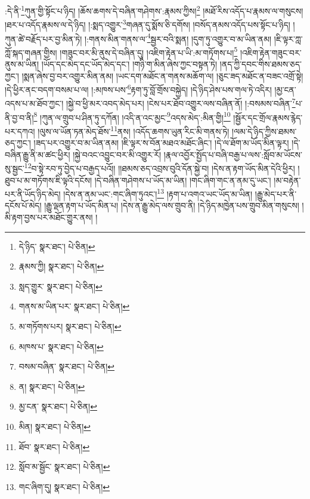 :དེ་ནི་\footnote{དེ་ཉིད་  སྣར་ཐང་།  པེ་ཅིན། }ཀུན་གྱི་སྟོང་པ་ཉིད། །ཆོས་ཆགས་དེ་བཞིན་གཤེགས་:རྣམས་ཀྱིས།\footnote{རྣམས་ཀྱི།  སྣར་ཐང་།  པེ་ཅིན། } །མཐོ་རིས་འདོད་པ་རྣམས་ལ་གསུངས། །ཐར་པ་འདོད་རྣམས་ལ་དེ་ཉིད། །:སྨད་འགྱུར་\footnote{སླད་གྱུར་  སྣར་ཐང་།  པེ་ཅིན། }གཞན་དུ་སྨོས་ཅི་དགོས། །བསོད་ནམས་འདོད་པས་སྟོང་པ་ཉིད། །ཀུན་ཚེ་བརྗོད་པར་བྱ་མིན་ཏེ། །:གནས་མིན་གནས་ལ་\footnote{གནས་མ་ཡིན་པར་  སྣར་ཐང་།  པེ་ཅིན། }སྦྱར་བའི་སྨན། །དུག་ཏུ་འགྱུར་བ་མ་ཡིན་ནམ། །ཇི་ལྟར་ཀླ་ཀློ་སྐད་གཞན་གྱིས། །གཟུང་བར་མི་ནུས་དེ་བཞིན་དུ། །འཇིག་རྟེན་པ་ཡི་:མ་གཏོགས་པ།\footnote{མ་གཏོགས་པར།  སྣར་ཐང་།  པེ་ཅིན། } །འཇིག་རྟེན་གཟུང་བར་ནུས་མ་ཡིན། །ཡོད་དང་མེད་དང་ཡོད་མེད་དང་། །གཉི་ག་མིན་ཞེས་ཀྱང་བསྟན་ཏེ། །ནད་ཀྱི་དབང་གིས་ཐམས་ཅད་ཀྱང་། །སྨན་ཞེས་བྱ་བར་འགྱུར་མིན་ནམ། །ཡང་དག་མཐོང་ན་གནས་མཆོག་ལ། །ཅུང་ཟད་མཐོང་ན་བཟང་འགྲོ་སྟེ། །དེ་ཕྱིར་ནང་བདག་བསམ་པ་ལ། །:མཁས་པས་\footnote{མཁས་པ་  སྣར་ཐང་།  པེ་ཅིན། }རྟག་ཏུ་བློ་གྲོས་བསྐྱེད། །དེ་ཉིད་ཤེས་པས་གལ་ཏེ་འདིར། །མྱ་ངན་འདས་པ་མ་ཐོབ་ཀྱང་། །སྐྱེ་བ་ཕྱི་མར་འབད་མེད་པར། །ངེས་པར་ཐོབ་འགྱུར་ལས་བཞིན་ནོ། །:བསམས་བཞིན་\footnote{བསམ་བཞིན་  སྣར་ཐང་།  པེ་ཅིན། }པ་ནི་བྱ་བ་ནི།\footnote{ན།  སྣར་ཐང་།  པེ་ཅིན། } །ཀུན་ལ་གྲུབ་པ་ཤིན་ཏུ་དཀོན། །འདི་ན་འང་མྱང་\footnote{མྱ་ངན་  སྣར་ཐང་།  པེ་ཅིན། }འདས་མེད་:མིན་གྱི།\footnote{མིན།  སྣར་ཐང་།  པེ་ཅིན། } །སྦྱོར་དང་གྲོལ་རྣམས་རྙེད་པར་དཀའ། །ལུས་ལ་ཡོན་ཏན་མེད་ཐོས་\footnote{ཐོབ་  སྣར་ཐང་།  པེ་ཅིན། }ནས། །འདོད་ཆགས་ཡུན་རིང་མི་གནས་ཏེ། །ལམ་དེ་ཉིད་ཀྱིས་ཐམས་ཅད་ཀྱང་། །ཟད་པར་འགྱུར་བ་མ་ཡིན་ནམ། །ཇི་ལྟར་ས་བོན་མཐའ་མཐོང་ཞིང་། །དེ་ལ་ཐོག་མ་ཡོད་མིན་ལྟར། །དེ་བཞིན་རྒྱུ་ནི་མ་ཚང་ཕྱིར། །སྐྱེ་བའང་འབྱུང་བར་མི་འགྱུར་རོ། །རྣལ་འབྱོར་སྤྱོད་པ་བཞི་བརྒྱ་པ་ལས་:སློབ་མ་ཡོངས་སུ་སྦྱང་\footnote{སློབ་མ་སྦྱོང་  སྣར་ཐང་།  པེ་ཅིན། }བ་སྟེ་རབ་ཏུ་བྱེད་པ་བརྒྱད་པའོ།། །།ཐམས་ཅད་འབྲས་བུའི་དོན་སྐྱེ་བ། །དེས་ན་རྟག་ཡོད་མིན་དེའི་ཕྱིར། །ཐུབ་པ་མ་གཏོགས་ཇི་ལྟའི་དངོས། །དེ་བཞིན་གཤེགས་པ་ཡོད་མ་ཡིན། །གང་ཞིག་གང་ན་ནམ་དུ་ཡང་། །མ་བརྟེན་པར་ནི་ཡོད་ཉིད་མེད། །དེས་ན་ནམ་ཡང་:གང་ཞིག་ཏུའང་།\footnote{གང་ཞིག་དུ།  སྣར་ཐང་།  པེ་ཅིན། } །རྟག་པ་འགའ་ཡང་ཡོད་མ་ཡིན། །རྒྱུ་མེད་པར་ནི་དངོས་པོ་མེད། །རྒྱུ་ལྡན་རྟག་པ་ཡོད་མིན་པ། །དེས་ན་རྒྱུ་མེད་ལས་གྲུབ་ནི། །དེ་ཉིད་མཁྱེན་པས་གྲུབ་མིན་གསུངས། །མི་རྟག་བྱས་པར་མཐོང་གྱུར་ནས། །
